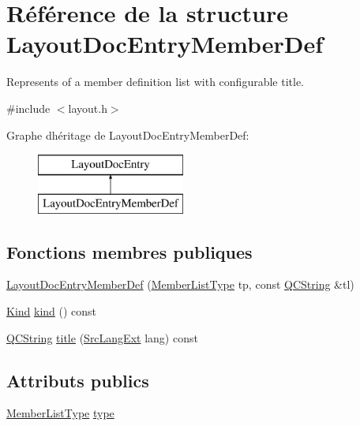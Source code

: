 \hypertarget{struct_layout_doc_entry_member_def}{}\section{Référence de la structure Layout\+Doc\+Entry\+Member\+Def}
\label{struct_layout_doc_entry_member_def}


Represents of a member definition list with configurable title.  




{\ttfamily \#include $<$layout.\+h$>$}

Graphe d\textquotesingle{}héritage de Layout\+Doc\+Entry\+Member\+Def\+:\begin{figure}[H]
\begin{center}
\leavevmode
\includegraphics[height=2.000000cm]{struct_layout_doc_entry_member_def}
\end{center}
\end{figure}
\subsection*{Fonctions membres publiques}
\begin{DoxyCompactItemize}
\item 
\hyperlink{struct_layout_doc_entry_member_def_ad362098564d3956bc5f596021afd7464}{Layout\+Doc\+Entry\+Member\+Def} (\hyperlink{types_8h_abe8ad5992f8938a28f918f51b199aa19}{Member\+List\+Type} tp, const \hyperlink{class_q_c_string}{Q\+C\+String} \&tl)
\item 
\hyperlink{struct_layout_doc_entry_a89dcbe762ed7e7f7790d8c034cf8ea01}{Kind} \hyperlink{struct_layout_doc_entry_member_def_a8a2db8fde0b290f478ea0f6e2ea1eeb0}{kind} () const 
\item 
\hyperlink{class_q_c_string}{Q\+C\+String} \hyperlink{struct_layout_doc_entry_member_def_a1a5dae22c20487d3611a9f647448963e}{title} (\hyperlink{types_8h_a9974623ce72fc23df5d64426b9178bf2}{Src\+Lang\+Ext} lang) const 
\end{DoxyCompactItemize}
\subsection*{Attributs publics}
\begin{DoxyCompactItemize}
\item 
\hyperlink{types_8h_abe8ad5992f8938a28f918f51b199aa19}{Member\+List\+Type} \hyperlink{struct_layout_doc_entry_member_def_a2c77d5fc0d714e32ef1b282e67c338d3}{type}
\end{DoxyCompactItemize}
